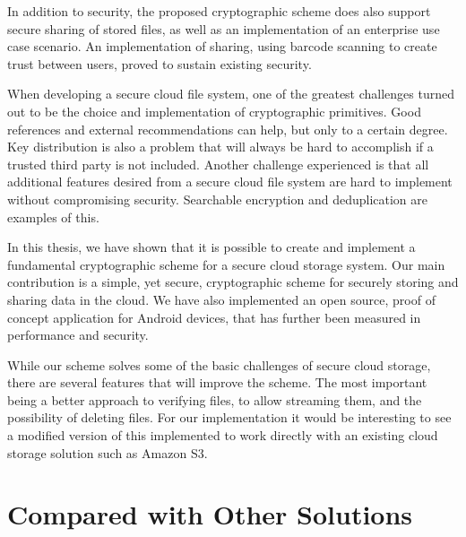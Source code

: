 \documentclass[pdftex,english,10pt,b5paper,twoside]{book}
\begin{document}
In addition to security, the proposed cryptographic scheme does also support
secure sharing of stored files, as well as an implementation of an enterprise
use case scenario. An implementation of sharing, using barcode scanning to
create trust between users, proved to sustain existing security. 

When developing a secure cloud file system, one of the greatest challenges
turned out to be the choice and implementation of cryptographic primitives.
Good references and external recommendations can help, but only to a certain
degree. Key distribution is also a problem that will always be hard to accomplish if a
trusted third party is not included. Another challenge experienced is that all
additional features desired from a secure cloud file system are hard to implement
without compromising security. Searchable encryption and deduplication are
examples of this.


In this thesis, we have shown that it is possible to create and implement a
fundamental cryptographic scheme for a secure cloud storage system. Our main
contribution is a simple, yet secure, cryptographic scheme for securely storing
and sharing data in the cloud. We have also implemented an open source, proof of
concept application for Android devices, that has further been measured in
performance and security.

While our scheme solves some of the basic challenges of secure cloud storage,
there are several features that will improve the scheme. The most important
being a better approach to verifying files, to allow streaming them, and the
possibility of deleting files. For our implementation it would be interesting
to see a modified version of this implemented to work directly with an existing
cloud storage solution such as Amazon S3.

\section{Compared with Other Solutions}



\appendix
\appendixpage
\addappheadtotoc
\end{document}
